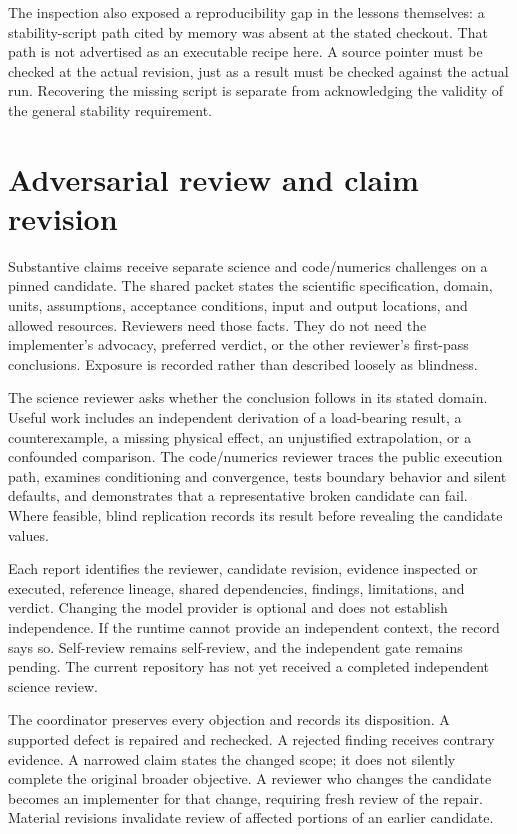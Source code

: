 \documentclass{article}
\begin{document}
The inspection also exposed a reproducibility gap in the lessons themselves: a stability-script path cited by memory was absent at the stated checkout. That path is not advertised as an executable recipe here. A source pointer must be checked at the actual revision, just as a result must be checked against the actual run. Recovering the missing script is separate from acknowledging the validity of the general stability requirement.

\section{Adversarial review and claim revision}
Substantive claims receive separate science and code/numerics challenges on a pinned candidate. The shared packet states the scientific specification, domain, units, assumptions, acceptance conditions, input and output locations, and allowed resources. Reviewers need those facts. They do not need the implementer's advocacy, preferred verdict, or the other reviewer's first-pass conclusions. Exposure is recorded rather than described loosely as blindness.

The science reviewer asks whether the conclusion follows in its stated domain. Useful work includes an independent derivation of a load-bearing result, a counterexample, a missing physical effect, an unjustified extrapolation, or a confounded comparison. The code/numerics reviewer traces the public execution path, examines conditioning and convergence, tests boundary behavior and silent defaults, and demonstrates that a representative broken candidate can fail. Where feasible, blind replication records its result before revealing the candidate values.

Each report identifies the reviewer, candidate revision, evidence inspected or executed, reference lineage, shared dependencies, findings, limitations, and verdict. Changing the model provider is optional and does not establish independence. If the runtime cannot provide an independent context, the record says so. Self-review remains self-review, and the independent gate remains pending. The current repository has not yet received a completed independent science review.

The coordinator preserves every objection and records its disposition. A supported defect is repaired and rechecked. A rejected finding receives contrary evidence. A narrowed claim states the changed scope; it does not silently complete the original broader objective. A reviewer who changes the candidate becomes an implementer for that change, requiring fresh review of the repair. Material revisions invalidate review of affected portions of an earlier candidate.
\end{document}
